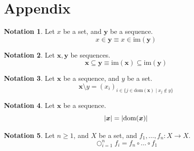 \documentclass{amsart}
\theoremstyle{definition}
\newtheorem{notation}{Notation}
\theoremstyle{remark}
\newcommand{\dom}{\mathrm{dom}}
\newcommand{\im}{\mathrm{im}}
\begin{document}
\clearpage

\section{Appendix}

\begin{notation}
Let $x$ be a set, and $\bm{y}$ be a sequence.
$$
	x\bm{\in}\bm{y}
	\equiv
	x\in\im(\bm{y})
$$
\end{notation}

\begin{notation}
Let $\bm{x},\bm{y}$ be sequences.
$$
	\bm{x}\bm{\subseteq}\bm{y}
	\equiv
	\im(\bm{x})\subseteq\im(\bm{y})
$$
\end{notation}

\begin{notation}
Let $\bm{x}$ be a sequence, and $y$ be a set.
$$
	\bm{x}\bm{\setminus}y
	=
	(x_{i})_{i\in\{j\in\dom(\bm{x})\mid x_{j}\not\in y\}}
$$
\end{notation}

\begin{notation}
Let $\bm{x}$ be a sequence.
$$
	\abs{\bm{x}}
	=
	\abs{\dom(\bm{x})}
$$
\end{notation}

\begin{notation}
Let $n\geq 1$, and $X$ be a set, and $f_{1},\dots,f_{n}:X\to X$.
$$
	\bigcirc_{i=1}^{n}f_{i}
	=
	f_{n}\circ\dots\circ f_{1}
$$
\end{notation}
\end{document}
